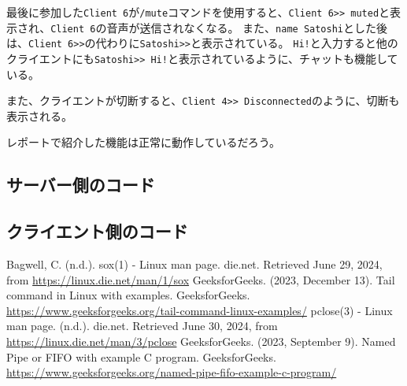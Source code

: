 \documentclass[a4paper]{ltjsarticle}
\begin{document}
最後に参加した\verb|Client 6|が\verb|/mute|コマンドを使用すると、\verb|Client 6>> muted|と表示され、\verb|Client 6|の音声が送信されなくなる。
また、\verb|name Satoshi|とした後は、\verb|Client 6>>|の代わりに\verb|Satoshi>>|と表示されている。
\verb|Hi!|と入力すると他のクライエントにも\verb|Satoshi>> Hi!|と表示されているように、チャットも機能している。

また、クライエントが切断すると、\verb|Client 4>> Disconnected|のように、切断も表示される。

レポートで紹介した機能は正常に動作しているだろう。

\subsection{サーバー側のコード}
\begin{multicols}{2}
    
\end{multicols}
\subsection{クライエント側のコード}
\begin{multicols}{2}
    
\end{multicols}

\begin{thebibliography}{99}
     Bagwell, C. (n.d.). sox(1) - Linux man page. die.net. Retrieved June 29, 2024, from \url{https://linux.die.net/man/1/sox}
     GeeksforGeeks. (2023, December 13). Tail command in Linux with examples. GeeksforGeeks. \url{https://www.geeksforgeeks.org/tail-command-linux-examples/}
     pclose(3) - Linux man page. (n.d.). die.net. Retrieved June 30, 2024, from \url{https://linux.die.net/man/3/pclose}
     GeeksforGeeks. (2023, September 9). Named Pipe or FIFO with example C program. GeeksforGeeks. \url{https://www.geeksforgeeks.org/named-pipe-fifo-example-c-program/}
\end{thebibliography}
\end{document}
